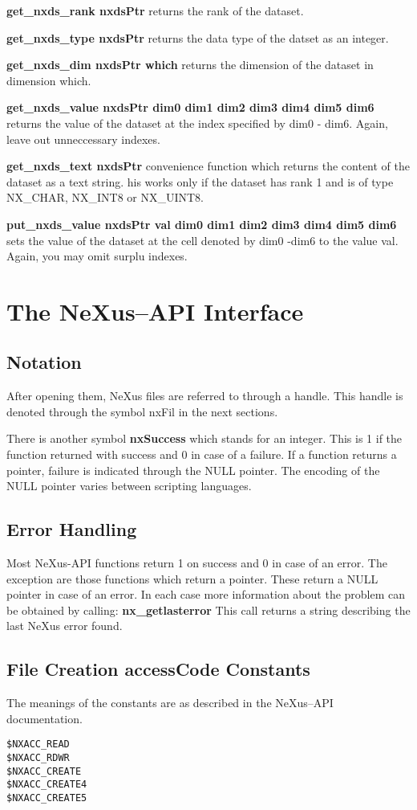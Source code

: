 \documentclass[12pt,a4paper]{article}
\begin{document}
{\bf get\_nxds\_rank nxdsPtr} returns the rank of the dataset.

{\bf get\_nxds\_type nxdsPtr} returns the data type of the datset as an
integer. 

{\bf get\_nxds\_dim nxdsPtr which} returns the dimension of the dataset
in dimension which. 

{\bf get\_nxds\_value nxdsPtr  dim0 dim1 dim2 dim3 dim4 dim5 dim6}
returns  the value of the dataset at the index specified by dim0 -
dim6. Again, leave out unneccessary indexes. 

{\bf get\_nxds\_text nxdsPtr} convenience function which returns the
content of the dataset as a text string. his works only if the dataset
has rank 1 and is of type NX\_CHAR, NX\_INT8 or NX\_UINT8. 

{\bf put\_nxds\_value nxdsPtr val dim0 dim1 dim2 dim3 dim4 dim5 dim6}
sets the value of the dataset at the cell denoted by dim0 -dim6 to the
value val. Again, you may omit surplu indexes.

	           
\section{The NeXus--API Interface}

\subsection{Notation}
After opening them, NeXus files are referred to through a
handle. This handle is denoted through the symbol {nxFil} in the next
sections. 

There is another symbol {\bf nxSuccess} which stands for an
integer. This is 1 if the function returned with success and 0 in case
of a failure. If a function returns a pointer, failure is indicated
through the NULL pointer. The encoding of the NULL pointer varies
between scripting languages. 


\subsection{Error Handling}
Most NeXus-API functions return 1 on success and 0 in case of an
error. The exception are those functions which return a pointer. These
return a NULL pointer in case of an error. In each case more
information about the problem can be obtained by calling:
{\bf nx\_getlasterror} This call returns a string describing the last
NeXus error found. 

\subsection{File Creation accessCode Constants}
The meanings of the constants are as described in the NeXus--API
documentation.
\begin{verbatim}
$NXACC_READ
$NXACC_RDWR
$NXACC_CREATE
$NXACC_CREATE4
$NXACC_CREATE5
\end{verbatim}
\end{document}
